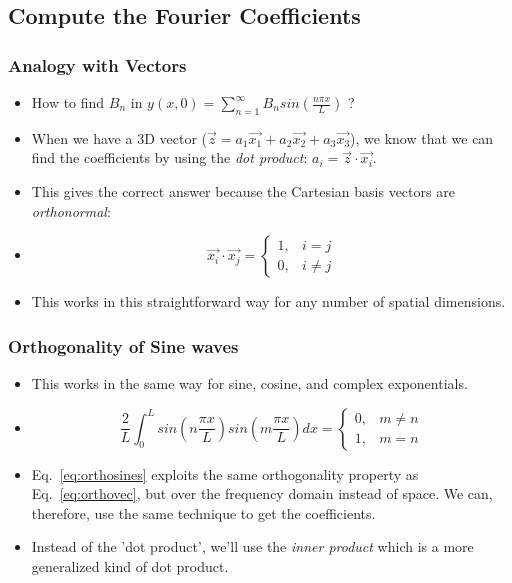 \documentclass[pdf, handout, hideothersubsections]{beamer}
\begin{document}
\subsection{Compute the Fourier Coefficients}
\begin{frame}
\frametitle{Analogy with Vectors}
\begin{itemize}
\item How to find $B_n$ in $y(x, 0) = \sum_{n=1}^{\infty} B_n
  sin(\frac{n \pi x}{L})$ ?
  \pause
\item When we have a 3D vector ($\vec{z} = a_1 \vec{x_1} + a_2 \vec{x_2} +
  a_3 \vec{x_3}$), we know that we can find the coefficients by using
  the \emph{dot product}: $a_i = \vec{z} \cdot \vec{x_i}$.
  \pause
\item This gives the correct
  answer because the Cartesian basis vectors are \emph{orthonormal}:
  \pause
\item \begin{equation}
        \vec{x_i} \cdot \vec{x_j} = \begin{cases}
          1, & i = j \\
          0, & i \ne j
          \end{cases}
      \label{eq:orthovec}
      \end{equation}
      \pause
\item This works in this straightforward way for any number of spatial dimensions.

\end{itemize}

\end{frame}




\begin{frame}
\frametitle{Orthogonality of Sine waves}
\begin{itemize}
\item This works in the same way for sine, cosine, and complex
  exponentials.
  \pause
\item \begin{equation}
    \frac{2}{L} \int_{0}^{L} sin(n \frac{\pi x}{L}) sin(m \frac{\pi x}{L}) dx
    = \begin{cases}
      0, & m \ne n \\
      1, & m = n
      \end{cases}
      \label{eq:orthosines}
    \end{equation}
    \pause
\item Eq.~\ref{eq:orthosines} exploits the same orthogonality property as
  Eq.~\ref{eq:orthovec}, but over the frequency domain instead of
  space. We can, therefore, use the same technique to get the coefficients.
  \pause
\item Instead of the 'dot product', we'll use the \emph{inner
    product} which is a more generalized kind of dot product.

\end{itemize}
\end{frame}
\end{document}
